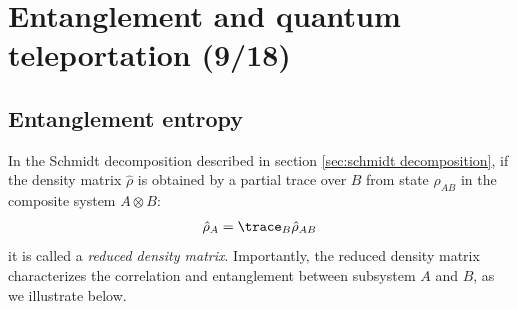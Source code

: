 \section{Entanglement and quantum teleportation (9/18)}


\subsection{Entanglement entropy}

In the Schmidt decomposition described in section {\ref{sec:schmidt decomposition}}, if the density matrix $\hat\rho$ is obtained by a partial trace over $B$ from state $\rho_{AB}$ in the composite system $A\otimes B$:
\begin{align}
\hat\rho_A=\trace_B\hat\rho_{AB}
\end{align}
it is called a \emph{reduced density matrix}. Importantly, the reduced density matrix characterizes the correlation and entanglement between subsystem $A$ and $B$, as we illustrate below. 



